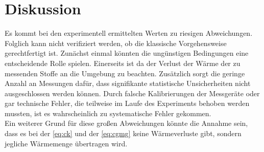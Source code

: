 \section{Diskussion}
\label{sec:Diskussion}

Es kommt bei den experimentell ermittelten Werten zu riesigen Abweichungen. Folglich kann nicht verifiziert werden, ob die klassische Vorgehensweise gerechtfertigt ist. Zunächst einmal könnten die ungünstigen Bedingungen eine entscheidende Rolle spielen. Einerseits ist da der Verlust der Wärme der zu messenden Stoffe an die Umgebung zu beachten. Zusätzlich sorgt die geringe Anzahl an Messungen dafür, dass signifikante statistische Unsicherheiten nicht ausgeschlossen werden können. Durch falsche Kalibrierungen der Messgeräte oder gar technische Fehler, die teilweise im Laufe des Experiments behoben werden mussten, ist es wahrscheinlich zu systematische Fehler gekommen.\\
Ein weiterer Grund für diese großen Abweichungen könnte die Annahme sein, dass es bei der \autoref{eq:ck} und der \autoref{eq:cgmg} keine Wärmeverluste gibt, sondern jegliche Wärmemenge übertragen wird. 